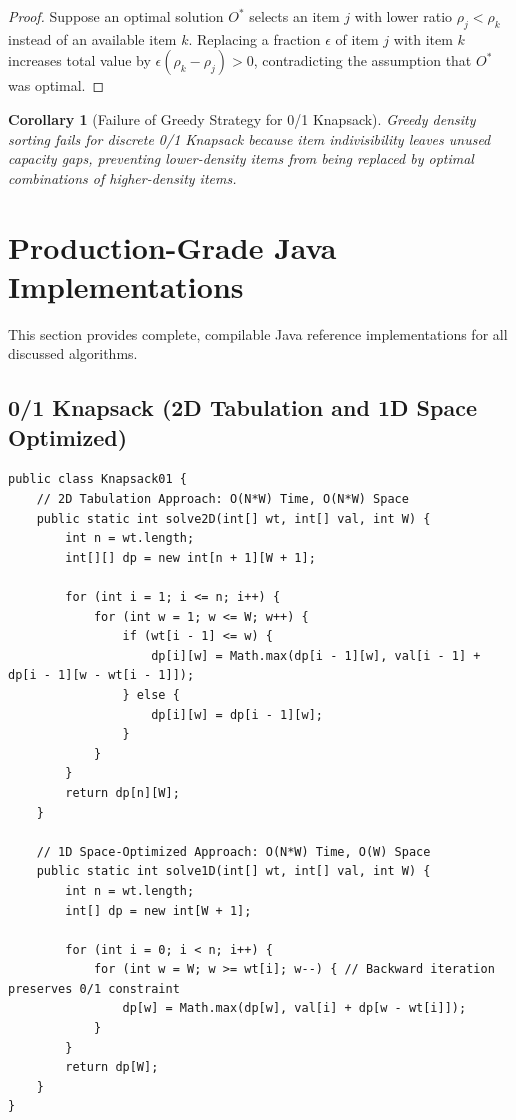 \documentclass[10pt,journal,compsoc,onecolumn]{IEEEtran}
\newtheorem{corollary}[theorem]{Corollary}
\begin{document}
\begin{proof}
Suppose an optimal solution $O^*$ selects an item $j$ with lower ratio $\rho_j < \rho_k$ instead of an available item $k$. Replacing a fraction $\epsilon$ of item $j$ with item $k$ increases total value by $\epsilon(\rho_k - \rho_j) > 0$, contradicting the assumption that $O^*$ was optimal.
\end{proof}

\begin{corollary}[Failure of Greedy Strategy for 0/1 Knapsack]
Greedy density sorting fails for discrete 0/1 Knapsack because item indivisibility leaves unused capacity gaps, preventing lower-density items from being replaced by optimal combinations of higher-density items.
\end{corollary}


\section{Production-Grade Java Implementations}
\label{sec:java-implementations}

This section provides complete, compilable Java reference implementations for all discussed algorithms.

\subsection{0/1 Knapsack (2D Tabulation and 1D Space Optimized)}

\begin{verbatim}
public class Knapsack01 {
    // 2D Tabulation Approach: O(N*W) Time, O(N*W) Space
    public static int solve2D(int[] wt, int[] val, int W) {
        int n = wt.length;
        int[][] dp = new int[n + 1][W + 1];

        for (int i = 1; i <= n; i++) {
            for (int w = 1; w <= W; w++) {
                if (wt[i - 1] <= w) {
                    dp[i][w] = Math.max(dp[i - 1][w], val[i - 1] + dp[i - 1][w - wt[i - 1]]);
                } else {
                    dp[i][w] = dp[i - 1][w];
                }
            }
        }
        return dp[n][W];
    }

    // 1D Space-Optimized Approach: O(N*W) Time, O(W) Space
    public static int solve1D(int[] wt, int[] val, int W) {
        int n = wt.length;
        int[] dp = new int[W + 1];

        for (int i = 0; i < n; i++) {
            for (int w = W; w >= wt[i]; w--) { // Backward iteration preserves 0/1 constraint
                dp[w] = Math.max(dp[w], val[i] + dp[w - wt[i]]);
            }
        }
        return dp[W];
    }
}
\end{verbatim}
\end{document}
